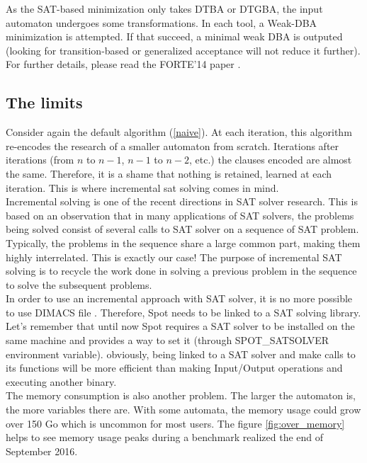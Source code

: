 \noindent As the SAT-based minimization only takes DTBA or DTGBA, the input automaton undergoes some
transformations. In each tool, a Weak-DBA minimization is attempted. If that succeed, a minimal weak DBA
is outputed (looking for transition-based or generalized acceptance will not reduce it further). For
further details, please read the FORTE'14 paper \cite{14}.

\subsection{The limits}
Consider again the default algorithm (\ref{naive}).
At each iteration, this algorithm re-encodes the research of a smaller automaton from scratch. Iterations
after iterations (from $n$ to $n-1$, $n-1$ to $n-2$, etc.) the clauses encoded are almost the same.
Therefore, it is a shame that nothing is retained, learned at each iteration. This is where incremental sat
solving comes in mind.\\

Incremental solving is one of the recent directions in SAT solver research. This is
based on an observation that in many applications of SAT solvers, the problems being solved consist of
several calls to SAT solver on a sequence of SAT problem. Typically, the problems in the sequence share a
large common part, making them highly interrelated. This is exactly our case! The purpose of incremental
SAT solving is to recycle the work done in solving a previous problem in the sequence to solve the
subsequent problems.\\

In order to use an incremental approach with SAT solver, it is no more possible to use DIMACS file
\cite{18}. Therefore, Spot needs to be linked to a SAT solving library. Let's remember that until now
Spot requires a SAT solver to be installed on the same machine and provides a way to set it (through
SPOT\_SATSOLVER environment variable). obviously, being linked to a SAT solver and make calls to its
functions will be more efficient than making Input/Output operations and executing another binary.\\

The memory consumption is also another problem. The larger the automaton is, the more variables there are.
With some automata, the memory usage could grow over 150 Go which is uncommon for most users. The figure
\ref{fig:over_memory} helps to see memory usage peaks during a benchmark realized the end of September
2016.\\

